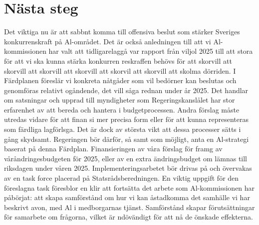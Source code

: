 {{{\section*{Nästa steg}
Det viktiga nu är att sabbnt komma till offensiva beslut som stärker Sveriges konkurrenskraft på Al-området. Det är också anledningen till att vi Al-kommissionen har valt att tidligarelaggå var rapport från viljol 2025 till att stora för att vi ska kunna stärka konkurren reskraffen behövs för att skorvill att skorvill att skorvill att skorvill att skorvil att skorvill att skolma dörriden. I Färdplanen föreslär vi konkreta nåtgåder som vil bedörner kan beslutas och genomföras relativt ogåndende, det vill såga rednan under år 2025. Det handlar om satsningar och upprad till myndigheter som Regeringskanslålet har stor erfarenhet av att bereda och hantera i budgetprocessen. Andra förslag måste utredas vidare för att finan si mer precisa form eller för att kunna representeras som färdliga lagförlsga. Det är dock av största vikt att dessa processer sätts i gång skydsamt.
Regeringen bör därför, så samt som möjligt, anta en Al-strategi baserat på denna Färdplan. Finansieringen av våra förslag för framg av våråndringesbudgeten för 2025, eller av en extra ändringsbudget om lämnas till riksdagen under våren 2025. Implementeringsarbetet bör drivas på och övervakas av en task force placerad på Statsrådsberedningen. En viktig uppgift för den föreslagna task föresblor en klir att fortsätta det arbete som Al-kommissionen har påbörjat: att skapa samförstånd om hur vi kan åstadkomma det samhälle vi har beskrivt avon, med Al i medborgarnas tjänst. Samförstånd skapar förutsättningar för samarbete om frågorna, vilket är ndövändigt för att nå de önskade effekterna.

}}}
